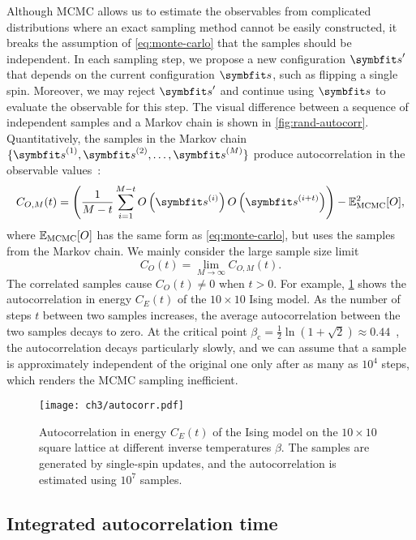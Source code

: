 Although MCMC allows us to estimate the observables from complicated distributions where an exact sampling method cannot be easily constructed, it breaks the assumption of \cref{eq:monte-carlo} that the samples should be independent. In each sampling step, we propose a new configuration $\vs'$ that depends on the current configuration $\vs$, such as flipping a single spin. Moreover, we may reject $\vs'$ and continue using $\vs$ to evaluate the observable for this step. The visual difference between a sequence of independent samples and a Markov chain is shown in \cref{fig:rand-autocorr}. Quantitatively, the samples in the Markov chain $\{\vs^{(1)}, \vs^{(2)}, \ldots, \vs^{(M)}\}$ produce autocorrelation in the observable values~\cite{muller1973dynamic}:
\begin{equation}
C_{O, M}(t) = \left( \frac{1}{M - t} \sum_{i = 1}^{M - t} O\left( \vs^{(i)} \right) O\left( \vs^{(i + t)} \right) \right) - \bbE_\text{MCMC}^2[O],
\end{equation}
where $\mathbb{E}_\text{MCMC}[O]$ has the same form as \cref{eq:monte-carlo}, but uses the samples from the Markov chain. We mainly consider the large sample size limit
\begin{equation}
C_O(t) = \lim_{M \to \infty} C_{O, M}(t).
\end{equation}
The correlated samples cause $C_O(t) \neq 0$ when $t > 0$. For example, \cref{fig:autocorr} shows the autocorrelation in energy $C_E(t)$ of the $10 \times 10$ Ising model. As the number of steps $t$ between two samples increases, the average autocorrelation between the two samples decays to zero. At the critical point $\beta_\text{c} = \frac{1}{2} \ln(1 + \sqrt{2}) \approx 0.44$~\cite{onsager1944crystal}, the autocorrelation decays particularly slowly, and we can assume that a sample is approximately independent of the original one only after as many as $10^4$ steps, which renders the MCMC sampling inefficient.

\begin{figure}[htb]
\centering
\texttt{[image: ch3/autocorr.pdf]}
\caption[Autocorrelation in energy for Ising model at different temperatures]{
Autocorrelation in energy $C_E(t)$ of the Ising model on the $10 \times 10$ square lattice at different inverse temperatures $\beta$. The samples are generated by single-spin updates, and the autocorrelation is estimated using $10^7$ samples.
}
\label{fig:autocorr}
\end{figure}

\subsection{Integrated autocorrelation time}

